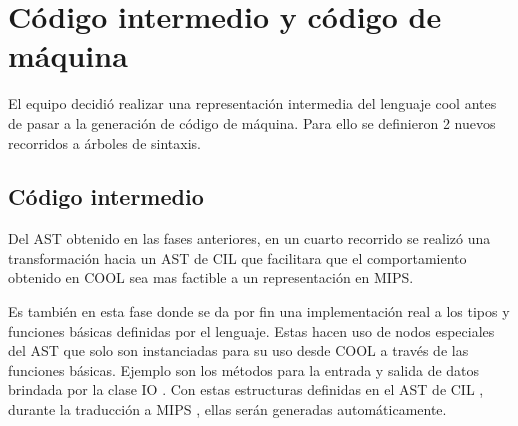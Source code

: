 \documentclass[a4paper,10pt,twocolumn]{article}
\begin{document}
\section{Código intermedio y código de máquina}

El equipo decidió realizar una representación intermedia del lenguaje cool antes de pasar a la generación de código de máquina. Para ello se definieron 2 nuevos recorridos a árboles de sintaxis.

\subsection{Código intermedio}
	
 Del AST obtenido en las fases anteriores, en un cuarto recorrido se realizó una transformación hacia un AST de  CIL  que facilitara que el comportamiento obtenido en  COOL  sea mas factible a un representación en MIPS.


 Es también en esta fase donde se da por fin una implementación real a los tipos y
 funciones básicas definidas por el lenguaje. Estas hacen uso de nodos especiales
 del AST que solo son instanciadas para su uso desde  COOL a través de las funciones
 básicas. Ejemplo son los métodos para la entrada y salida de datos brindada por la
 clase  IO . Con estas estructuras definidas en el AST de  CIL , durante la traducción a
 MIPS , ellas serán generadas automáticamente.
 
\end{document}

